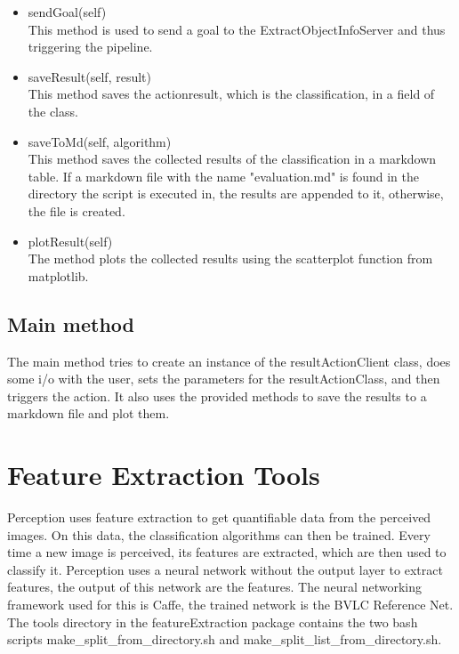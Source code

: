 \documentclass[main.tex]{subfiles}
\begin{document}
\begin{itemize}
\item 
sendGoal(self)\\
This method is used to send a goal to the ExtractObjectInfoServer and thus triggering the pipeline.

\item saveResult(self, result)\\
This method saves the actionresult, which is the classification, in a field of the class.

\item saveToMd(self, algorithm)\\
This method saves the collected results of the classification in a markdown table. If a markdown file with the name "evaluation.md" is found in the directory the script is executed in, the results are appended to it, otherwise, the file is created.

\item plotResult(self)\\
The method plots the collected results using the scatterplot function from matplotlib.
\end{itemize}

\subsection{Main method}
The main method tries to create an instance of the resultActionClient class, does some i/o with the user, sets the parameters for the resultActionClass, and then triggers the action. It also uses the provided methods to save the results to a markdown file and plot them.

\section{Feature Extraction Tools}
Perception uses feature extraction to get quantifiable data from the perceived images. On this data, the classification algorithms can then be trained. Every time a new image is perceived, its features are extracted, which are then used to classify it. Perception uses a neural network without the output layer to extract features, the output of this network are the features. The neural networking framework used for this is Caffe, the trained network is the BVLC Reference Net. The tools directory in the featureExtraction package contains the two bash scripts make\_split\_from\_directory.sh and make\_split\_list\_from\_directory.sh.
\end{document}
